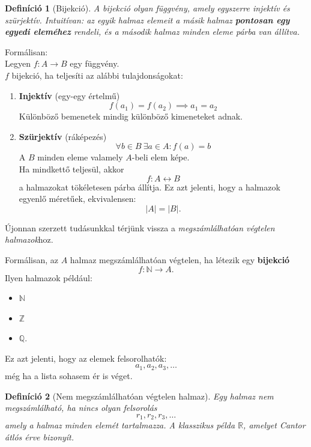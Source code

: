 \documentclass{article}
\newtheorem{definition}{Definíció}
\begin{document}
\begin{definition}[Bijekció]
    A bijekció olyan függvény, amely egyszerre injektív és szürjektív. Intuitívan: az egyik halmaz elemeit a másik halmaz \textbf{pontosan egy egyedi eleméhez} rendeli, és a második halmaz minden eleme párba van állítva.
\end{definition}
    Formálisan:\\
    Legyen $f : A \rightarrow B$ egy függvény.\\
    $f$ bijekció, ha teljesíti az alábbi tulajdonságokat:
    \begin{enumerate}
        \item \textbf{Injektív} (egy-egy értelmű)
        \[
            f(a_1) = f(a_2) \implies a_1 = a_2
        \]
        Különböző bemenetek mindig különböző kimeneteket adnak.
        \item \textbf{Szürjektív} (ráképezés)
        \[
            \forall b \in B \: \exists a \in A : f(a) = b
        \]
        A $B$ minden eleme valamely $A$-beli elem képe.\\
        Ha mindkettő teljesül, akkor
        \[
        f : A \leftrightarrow B
        \]
        a halmazokat tökéletesen párba állítja. Ez azt jelenti, hogy a halmazok egyenlő méretűek, ekvivalensen:
        \[
        |A| = |B|.
        \]
    \end{enumerate}

    
Újonnan szerzett tudásunkkal térjünk vissza a \emph{megszámlálhatóan végtelen halmazok}hoz.

    Formálisan, az $A$ halmaz megszámlálhatóan végtelen, ha létezik egy \textbf{bijekció}
    \[
    f: \mathbb{N} \rightarrow A.
    \]
    Ilyen halmazok például:
    \begin{itemize}
        \item $\mathbb{N}$
        \item $\mathbb{Z}$
        \item $\mathbb{Q}$.
    \end{itemize}
    Ez azt jelenti, hogy az elemek felsorolhatók:
    \[
    a_1, a_2, a_3, \ldots
    \]
    még ha a lista sohasem ér is véget.

\begin{definition}[Nem megszámlálhatóan végtelen halmaz]
    Egy halmaz nem megszámlálható, ha nincs olyan felsorolás
    \[
    r_1, r_2, r_3, \ldots
    \]
    amely a halmaz minden elemét tartalmazza.
    A klasszikus példa $\mathbb{R}$, amelyet Cantor átlós érve bizonyít.
\end{definition}
\end{document}
